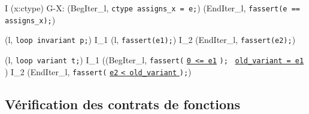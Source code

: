 {\scriptsize
  {
    {
       {
        I \concat
        \forall (x:ctype) \in G-X:
        (BegIter_l, \mbox{\lstinline'ctype assigns_x = e;'})
        \concat (EndIter_l, \mbox{\lstinline'fassert(e == assigns_x);'})
      }
    }
  }
}

{\scriptsize
  {
    {
      (l, \mbox{\lstinline'loop invariant p;'}) 
      I_1 \concat (l, \mbox{\lstinline'fassert(e1);'})
      \concat I_2 \concat (EndIter_l, \mbox{\lstinline'fassert(e2);'})
    }
  }
}

{\scriptsize
  {
    {
      \splitfrac
          {
            (l, \mbox{\lstinline'loop variant t;'}) 
          }
          {
            I_1 \concat ((BegIter_l,
            \mbox{\lstinline'fassert('}
            \underline{\mbox{\lstinline'0 <= e1'}}
            \mbox{\lstinline');' }
            \underline{\Zinit \mbox{\lstinline'old_variant = e1'} \Zclear}
            \semicolon)
            \concat I_2
            \concat(EndIter_l,
            \mbox{\lstinline'fassert('}
            \underline{\mbox{\lstinline'e2'}\Zclear
              \mbox{\lstinline'< old_variant'} \Zclear}
            \mbox{\lstinline');'})
          }
    }
  }
}


\subsection{Vérification des contrats de fonctions}

